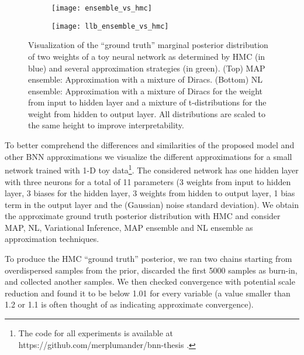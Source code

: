 \documentclass[../thesis.tex]{subfiles}
\begin{document}
\begin{figure}[h!]
    \centering
    \begin{subfigure}{0.9\textwidth}
    \texttt{[image: ensemble\_vs\_hmc]}
    \end{subfigure}
    \begin{subfigure}{0.9\textwidth}
    \texttt{[image: llb\_ensemble\_vs\_hmc]}
    \end{subfigure}

    \caption{Visualization of the ``ground truth'' marginal posterior distribution of two weights of a toy neural network as determined by HMC (in blue) and several approximation strategies (in green). (Top) MAP ensemble: Approximation with a mixture of Diracs. (Bottom) NL ensemble: Approximation with a mixture of Diracs for the weight from input to hidden layer and a mixture of t-distributions for the weight from hidden to output layer. All distributions are scaled to the same height to improve interpretability.}
    \label{fig:weight-space-approximations-2}
\end{figure}

To better comprehend the differences and similarities of the proposed model and other BNN approximations we visualize the different approximations for a small network trained with 1-D toy data\footnote{The code for all experiments is available at https://github.com/merplumander/bnn-thesis .}. The considered network has one hidden layer with three neurons for a total of 11 parameters (3 weights from input to hidden layer, 3 biases for the hidden layer, 3 weights from hidden to output layer, 1 bias term in the output layer and the (Gaussian) noise standard deviation). We obtain the approximate ground truth posterior distribution with HMC and consider MAP, NL, Variational Inference, MAP ensemble and NL ensemble as approximation techniques.

To produce the HMC ``ground truth'' posterior, we ran two chains starting from overdispersed samples from the prior, discarded the first 5000 samples as burn-in, and collected another  samples. We then checked convergence with potential scale reduction \parencite{gelman1992inference} and found it to be below 1.01 for every variable (a value smaller than 1.2 or 1.1 is often thought of as indicating approximate convergence). 
\end{document}
